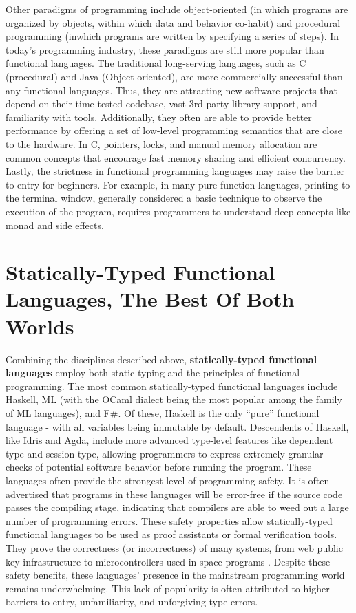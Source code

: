 Other paradigms of programming include object-oriented (in which programs are organized by objects, within which data and behavior co-habit) and procedural programming (inwhich programs are written by specifying a series of steps). In today's programming industry, these paradigms are still more popular than functional languages. The traditional long-serving languages, such as C (procedural) and Java (Object-oriented), are more commercially successful than any functional languages. Thus, they are attracting new software projects that depend on their time-tested codebase, vast 3rd party library support, and familiarity with tools. Additionally, they often are able to provide better performance by offering a set of low-level programming semantics that are close to the hardware. In C, pointers, locks, and manual memory allocation are common concepts that encourage fast memory sharing and efficient concurrency. Lastly, the strictness in functional programming languages may raise the barrier to entry for beginners. For example, in many pure function languages, printing to the terminal window, generally considered a basic technique to observe the execution of the program, requires programmers to understand deep concepts like monad and side effects.  


\section{Statically-Typed Functional Languages, The Best Of Both Worlds}
Combining the disciplines described above, \textbf{statically-typed functional languages} employ both static typing and the principles of functional programming. The most common statically-typed functional languages include Haskell,  ML (with the OCaml dialect being the most popular among the family of ML languages), and F\#. 
Of these, Haskell is the only ``pure'' functional language - with all variables being immutable by default.
Descendents of Haskell, like Idris and Agda, include more advanced type-level features like dependent type and session type, allowing programmers to express extremely granular checks of potential software behavior before running the program. These languages often provide the strongest level of programming safety. It is often advertised that programs in these languages will be error-free if the source code passes the compiling stage, indicating that compilers are able to weed out a large number of programming errors. These safety properties allow statically-typed functional languages to be used as proof assistants or formal verification tools. They prove the correctness (or incorrectness) of many systems, from web public key infrastructure \cite{Bhargavan2021-no} to microcontrollers used in space programs \cite{Mokhov2019-zj}. Despite these safety benefits, these languages' presence in the mainstream programming world remains underwhelming. This lack of popularity is often attributed to higher barriers to entry, unfamiliarity, and unforgiving type errors.

